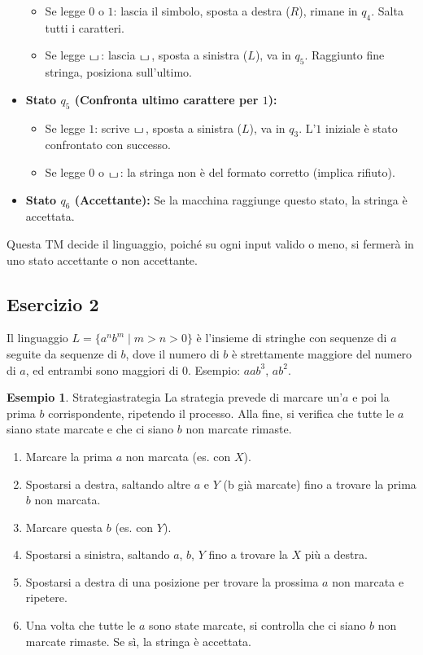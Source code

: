 \documentclass[a4paper]{article}
\theoremstyle{definition} %
\newtheorem{example}{Esempio}
\newcommand{\blankS}{\ensuremath{\raisebox{-0.15ex}{\scalebox{1.3}[0.7]{$\sqcup$}}\mkern2mu}}
\begin{document}
\begin{itemize}
    \begin{itemize}
        \item Se legge $0$ o $1$: lascia il simbolo, sposta a destra ($R$), rimane in $q_4$. Salta tutti i caratteri.
        \item Se legge \blankS: lascia \blankS, sposta a sinistra ($L$), va in $q_5$. Raggiunto fine stringa, posiziona sull'ultimo.
    \end{itemize}
    \item \textbf{Stato $q_5$ (Confronta ultimo carattere per $1$):}
    \begin{itemize}
        \item Se legge $1$: scrive \blankS, sposta a sinistra ($L$), va in $q_3$. L'$1$ iniziale è stato confrontato con successo.
        \item Se legge $0$ o \blankS: la stringa non è del formato corretto (implica rifiuto).
    \end{itemize}
    \item \textbf{Stato $q_6$ (Accettante):} Se la macchina raggiunge questo stato, la stringa è accettata.
\end{itemize}
Questa TM decide il linguaggio, poiché su ogni input valido o meno, si fermerà in uno stato accettante o non accettante.

\subsection{Esercizio 2}
Il linguaggio $L = \{a^n b^m \mid m > n > 0\}$ è l'insieme di stringhe con sequenze di $a$ seguite da sequenze di $b$, dove il numero di $b$ è strettamente maggiore del numero di $a$, ed entrambi sono maggiori di $0$. Esempio: $aab^{3}$, $ab^{2}$.

\begin{example}{Strategia}{strategia}
La strategia prevede di marcare un'$a$ e poi la prima $b$ corrispondente, ripetendo il processo. Alla fine, si verifica che tutte le $a$ siano state marcate e che ci siano $b$ non marcate rimaste.
\begin{enumerate}
    \item Marcare la prima $a$ non marcata (es. con $X$).
    \item Spostarsi a destra, saltando altre $a$ e $Y$ (b già marcate) fino a trovare la prima $b$ non marcata.
    \item Marcare questa $b$ (es. con $Y$).
    \item Spostarsi a sinistra, saltando $a$, $b$, $Y$ fino a trovare la $X$ più a destra.
    \item Spostarsi a destra di una posizione per trovare la prossima $a$ non marcata e ripetere.
    \item Una volta che tutte le $a$ sono state marcate, si controlla che ci siano $b$ non marcate rimaste. Se sì, la stringa è accettata.
\end{enumerate}
\end{example}
\end{document}
